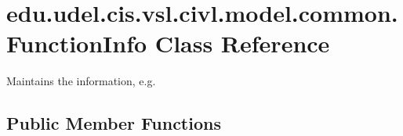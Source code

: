 \hypertarget{classedu_1_1udel_1_1cis_1_1vsl_1_1civl_1_1model_1_1common_1_1FunctionInfo}{}\section{edu.\+udel.\+cis.\+vsl.\+civl.\+model.\+common.\+Function\+Info Class Reference}
\label{classedu_1_1udel_1_1cis_1_1vsl_1_1civl_1_1model_1_1common_1_1FunctionInfo}


Maintains the information, e.\+g.  


\subsection*{Public Member Functions}
